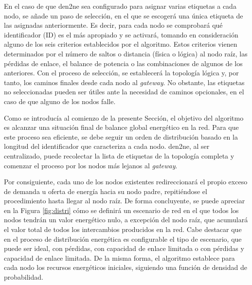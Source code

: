 \vspace{3mm}

En el caso de que \gls{den2ne} sea configurado para asignar varias etiquetas a cada nodo, se añade un paso de selección, en el que se escogerá una única etiqueta de las asignadas anteriormente. Es decir, para cada nodo se comprobará qué identificador (ID) es el más apropiado y se activará, tomando en consideración alguno de los seis criterios establecidos por el algoritmo. Estos criterios vienen determinados por el número de saltos o distancia (física o lógica) al nodo raíz, las pérdidas de enlace, el balance de potencia o las combinaciones de algunos de los anteriores. Con el proceso de selección, se establecerá la topología lógica y, por tanto, los caminos finales desde cada nodo al \textit{gateway}. No obstante, las etiquetas no seleccionadas pueden ser útiles ante la necesidad de caminos opcionales, en el caso de que alguno de los nodos falle.

\vspace{3mm}

Como se introducía al comienzo de la presente Sección, el objetivo del algoritmo es alcanzar una situación final de balance global energético en la red. Para que este proceso sea eficiente, se debe seguir un orden de distribución basado en la longitud del identificador que caracteriza a cada nodo. \gls{den2ne}, al ser centralizado, puede recolectar la lista de etiquetas de la topología completa y comenzar el proceso por los nodos más lejanos al \textit{gateway}. 

\vspace{3mm}

Por consiguiente, cada uno de los nodos existentes redireccionará el propio exceso de demanda u oferta de energía hacia su nodo padre, repitiéndose el procedimiento hasta llegar al nodo raíz. De forma concluyente, se puede apreciar en la Figura \ref{fig:distri} cómo se definirá un escenario de red en el que todos los nodos tendrán un valor energético nulo, a excepción del nodo raíz, que acumulará el valor total de todos los intercambios producidos en la red. Cabe destacar que en el proceso de distribución energética es configurable el tipo de escenario, que puede ser ideal, con pérdidas, con capacidad de enlace limitada o con pérdidas y capacidad de enlace limitada. De la misma forma, el algoritmo establece para cada nodo los recursos energéticos iniciales, siguiendo una función de densidad de probabilidad.

\vspace{3mm}

